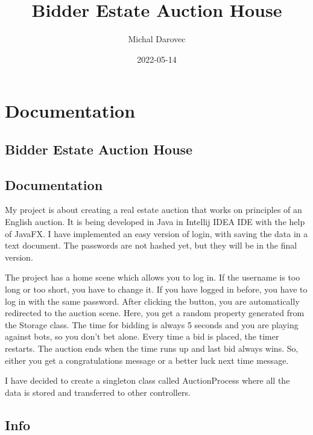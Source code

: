 \documentclass[
]{report}
\title{Bidder Estate Auction House}
\author{Michal Darovec}
\date{2022-05-14}
\begin{document}
\maketitle

{
\setcounter{tocdepth}{1}
\tableofcontents
}
\hypertarget{documentation}{%
\chapter{Documentation}\label{documentation}}

\hypertarget{bidder-estate-auction-house}{%
\section{Bidder Estate Auction House}\label{bidder-estate-auction-house}}

\hypertarget{documentation-1}{%
\section{Documentation}\label{documentation-1}}

My project is about creating a real estate auction that works on principles of an English auction. It is being developed in Java in Intellij IDEA IDE with the help of JavaFX. I have implemented an easy version of login, with saving the data in a text document. The passwords are not hashed yet, but they will be in the final version.

The project has a home scene which allows you to log in. If the username is too long or too short, you have to change it. If you have logged in before, you have to log in with the same password. After clicking the button, you are automatically redirected to the auction scene. Here, you get a random property generated from the Storage class. The time for bidding is always 5 seconds and you are playing against bots, so you don't bet alone. Every time a bid is placed, the timer restarts. The auction ends when the time runs up and last bid always wins. So, either you get a congratulations message or a better luck next time message.

I have decided to create a singleton class called AuctionProcess where all the data is stored and transferred to other controllers.

\hypertarget{info}{%
\section{Info}\label{info}}
\end{document}

